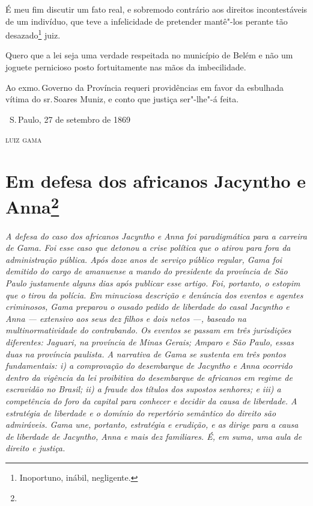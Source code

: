 É meu fim discutir um fato real, e sobremodo contrário aos direitos
incontestáveis de um indivíduo, que teve a infelicidade de pretender
mantê"-los perante tão desazado\footnote{Inoportuno, inábil,
  negligente.} juiz.

Quero que a lei seja uma verdade respeitada no município de Belém e não
um joguete pernicioso posto fortuitamente nas mãos da imbecilidade.

Ao exmo.\,Governo da Província requeri providências em favor da esbulhada
vítima do sr.\,Soares Muniz, e conto que justiça ser"-lhe"-á feita.

\vfill

\hfill\ S.\,Paulo, 27 de setembro de 1869\smallskip

\hfill\textsc{luiz gama}


\chapter{Em defesa dos africanos Jacyntho e Anna\footnote[*]{}} %

\begin{flushleft}
{\footnotesize\itshape
A defesa do caso dos africanos Jacyntho e Anna foi paradigmática
para a carreira de Gama. Foi esse caso que detonou a crise política que
o atirou para fora da administração pública. Após doze anos de serviço
público regular, Gama foi demitido do cargo de amanuense a mando do
presidente da província de São Paulo justamente alguns dias após
publicar esse artigo. Foi, portanto, o estopim que o tirou da polícia.
Em minuciosa descrição e denúncia dos eventos e agentes criminosos, Gama
preparou o ousado pedido de liberdade do casal Jacyntho e Anna ---
extensivo aos seus dez filhos e dois netos ---, baseado na
multinormatividade do contrabando. Os eventos se passam em três
jurisdições diferentes: Jaguari, na província de Minas Gerais; Amparo e
São Paulo, essas duas na província paulista. A narrativa de Gama se
sustenta em três pontos fundamentais: i) a comprovação do desembarque de
Jacyntho e Anna ocorrido dentro da vigência da lei proibitiva do
desembarque de africanos em regime de escravidão no Brasil; ii) a fraude
dos títulos dos supostos senhores; e iii) a competência do foro da
capital para conhecer e decidir da causa de liberdade. A estratégia de
liberdade e o domínio do repertório semântico do direito são admiráveis.
Gama une, portanto, estratégia e erudição, e as dirige para a causa de
liberdade de Jacyntho, Anna e mais dez familiares. É, em suma, uma aula
de direito e justiça.}
\end{flushleft}

